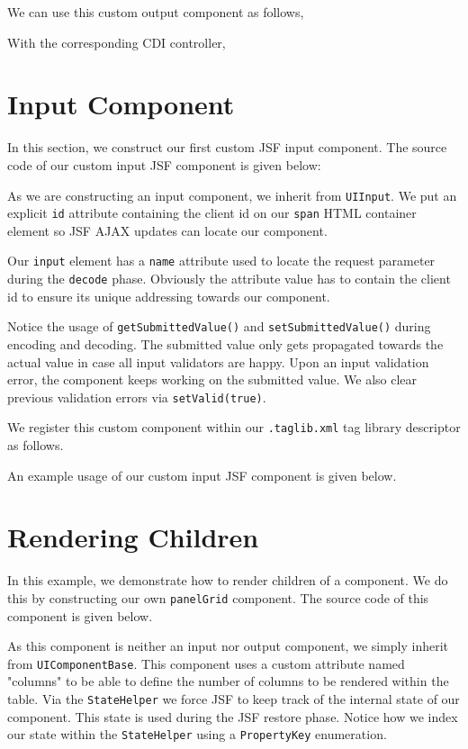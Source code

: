 We can use this custom output component as follows,


With the corresponding CDI controller,



\section{Input Component}
In this section, we construct our first custom JSF input component.
The source code of our custom input JSF component is given below:

As we are constructing an input component, we inherit from \texttt{UIInput}.
We put an explicit \texttt{id} attribute containing the client id on our \texttt{span} HTML container element so JSF AJAX updates can locate our component.

Our \texttt{input} element has a \texttt{name} attribute used to locate the request parameter during the \texttt{decode} phase.
Obviously the attribute value has to contain the client id to ensure its unique addressing towards our component.

Notice the usage of \texttt{getSubmittedValue()} and \texttt{setSubmittedValue()} during encoding and decoding.
The submitted value only gets propagated towards the actual value in case all input validators are happy.
Upon an input validation error, the component keeps working on the submitted value.
We also clear previous validation errors via \texttt{setValid(true)}.

We register this custom component within our \texttt{.taglib.xml} tag library descriptor as follows.


An example usage of our custom input JSF component is given below.


\section{Rendering Children}
In this example, we demonstrate how to render children of a component.
We do this by constructing our own \texttt{panelGrid} component.
The source code of this component is given below.

As this component is neither an input nor output component, we simply inherit from \texttt{UIComponentBase}.
This component uses a custom attribute named "columns" to be able to define the number of columns to be rendered within the table.
Via the \texttt{StateHelper} we force JSF to keep track of the internal state of our component.
This state is used during the JSF restore phase.
Notice how we index our state within the \texttt{StateHelper} using a \texttt{PropertyKey} enumeration.

